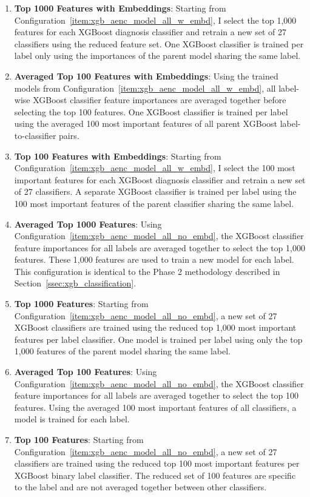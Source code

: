 \documentclass[\main/thesis.tex]{subfiles}
\begin{document}
\begin{enumerate}
    \item \label{item:xgb_aenc_model_top_1000_w_embd} \textbf{Top 1000 Features with Embeddings}: Starting from Configuration~\ref{item:xgb_aenc_model_all_w_embd}, I select the top 1,000 features for each XGBoost diagnosis classifier and retrain a new set of 27 classifiers using the reduced feature set. One XGBoost classifier is trained per label only using the importances of the parent model sharing the same label.
    \item \label{item:xgb_aenc_model_avgd_top_100_w_embd} \textbf{Averaged Top 100 Features with Embeddings}: Using the trained models from Configuration~\ref{item:xgb_aenc_model_all_w_embd}, all label-wise XGBoost classifier feature importances are averaged together before selecting the top 100 features. One XGBoost classifier is trained per label using the averaged 100 most important features of all parent XGBoost label-to-classifier pairs.
    \item \label{item:xgb_aenc_model_top_100_w_embd} \textbf{Top 100 Features with Embeddings}: Starting from Configuration~\ref{item:xgb_aenc_model_all_w_embd}, I select the 100 most important features for each XGBoost diagnosis classifier and retrain a new set of 27 classifiers.
    A separate XGBoost classifier is trained per label using the 100 most important features of the parent classifier sharing the same label.
    \item \label{item:xgb_aenc_model_avgd_top_1000_no_embd} \textbf{Averaged Top 1000 Features}: Using Configuration~\ref{item:xgb_aenc_model_all_no_embd}, the XGBoost classifier feature importances for all labels are averaged together to select the top 1,000 features. These 1,000 features are used to train a new model for each label. This configuration is identical to the Phase 2 methodology described in Section~\ref{ssec:xgb_classification}.
    \item \label{item:xgb_aenc_model_top_1000_no_embd} \textbf{Top 1000 Features}: Starting from Configuration~\ref{item:xgb_aenc_model_all_no_embd}, a new set of 27 XGBoost classifiers are trained using the reduced top 1,000 most important features per label classifier.
    One model is trained per label using only the top 1,000 features of the parent model sharing the same label.
    \item \label{item:xgb_aenc_model_avgd_top_100_no_embd} \textbf{Averaged Top 100 Features}: Using Configuration~\ref{item:xgb_aenc_model_all_no_embd}, the XGBoost classifier feature importances for all labels are averaged together to select the top 100 features.
    Using the averaged 100 most important features of all classifiers, a model is trained for each label.
    \item \label{item:xgb_aenc_model_top_100_no_embd} \textbf{Top 100 Features}: Starting from Configuration~\ref{item:xgb_aenc_model_all_no_embd}, a new set of 27 classifiers are trained using the reduced top 100 most important features per XGBoost binary label classifier.
    The reduced set of 100 features are specific to the label and are not averaged together between other classifiers.
\end{enumerate}
\end{document}
